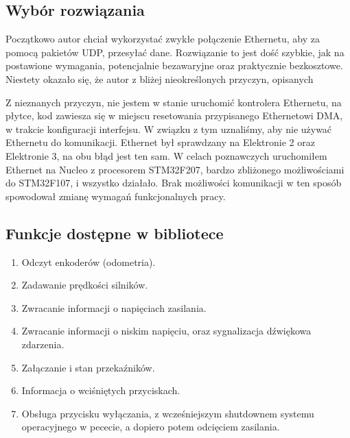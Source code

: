 \documentclass[10pt,a4paper]{article}
\begin{document}
	\begin{}
	\subsection{Wybór rozwiązania}
	Początkowo autor chciał wykorzystać zwykłe połączenie Ethernetu, aby za pomocą pakietów UDP, przesyłać dane. Rozwiązanie to jest dość szybkie, jak na postawione wymagania, potencjalnie bezawaryjne oraz praktycznie bezkosztowe. Niestety okazało się, że autor z bliżej nieokreślonych przyczyn, opisanych 



	Z nieznanych przyczyn, nie jestem w stanie uruchomić kontrolera Ethernetu, na płytce, kod zawiesza się w miejscu resetowania przypisanego Ethernetowi DMA, w trakcie konfiguracji interfejsu. W związku z tym uznaliśmy, aby nie używać Ethernetu do komunikacji. Ethernet był sprawdzany na Elektronie 2 oraz Elektronie 3, na obu błąd jest ten sam. W celach poznawczych uruchomiłem Ethernet na Nucleo z procesorem STM32F207, bardzo zbliżonego możliwościami do STM32F107, i wszystko działało. Brak możliwości komunikacji w ten sposób spowodował zmianę wymagań funkcjonalnych pracy.

	\subsection{Funkcje dostępne w bibliotece}
	\begin{enumerate}
		\item Odczyt enkoderów (odometria).
		\item Zadawanie prędkości silników.
		\item Zwracanie informacji o napięciach zasilania.
		\item Zwracanie informacji o niskim napięciu, oraz sygnalizacja dźwiękowa zdarzenia.
		\item Załączanie i stan przekaźników.
		\item Informacja o wciśniętych przyciskach.
		\item Obsługa przycisku wyłączania, z wcześniejszym shutdownem systemu operacyjnego w pececie, a dopiero potem odcięciem zasilania.
	\end{enumerate}

\end{}
\end{document}
